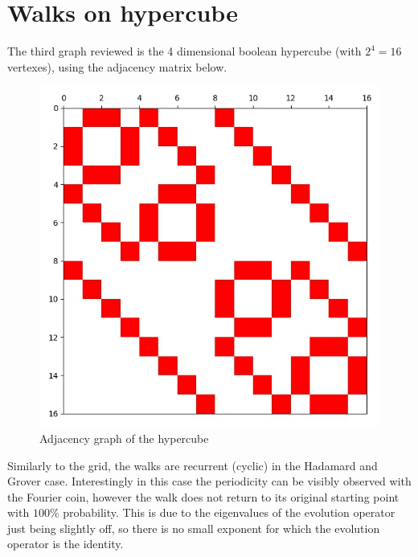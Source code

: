 \section{Walks on hypercube}

The third graph reviewed is the 4 dimensional boolean hypercube (with $2^4 = 16$ vertexes), using the adjacency matrix below.

\begin{figure}[H]
\centering
\includegraphics[width=0.5\linewidth]{./figures/results/hypercube/graph.jpg}
\caption{Adjacency graph of the hypercube}
\end{figure}

Similarly to the grid, the walks are recurrent (cyclic) in the Hadamard and Grover case. Interestingly in this case the periodicity can be visibly observed with the Fourier coin, however the walk does not return to its
original starting point with $100\%$ probability. This is due to the eigenvalues of the evolution operator
just being slightly off, so there is no small exponent for which the evolution operator is the identity.


